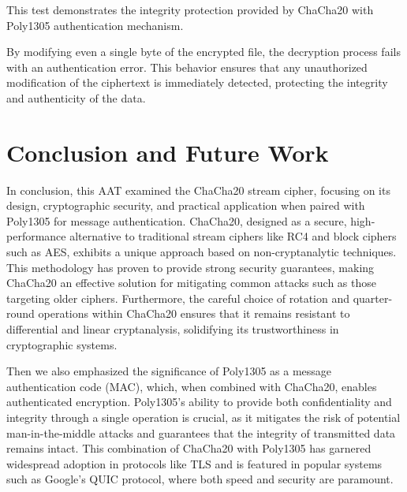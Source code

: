\documentclass[a4paper,12pt]{report}
\begin{document}
This test demonstrates the integrity protection provided by ChaCha20 with Poly1305 authentication mechanism.

By modifying even a single byte of the encrypted file, the decryption process fails with an authentication error.
This behavior ensures that any unauthorized modification of the ciphertext is immediately detected, protecting the integrity and authenticity of the data.





\chapter{Conclusion and Future Work}

In conclusion, this AAT examined the ChaCha20 stream cipher, focusing on its design, cryptographic security, and practical application when paired with Poly1305 for message authentication.
ChaCha20, designed as a secure, high-performance alternative to traditional stream ciphers like RC4 and block ciphers such as AES, exhibits a unique approach based on non-cryptanalytic techniques.
This methodology has proven to provide strong security guarantees, making ChaCha20 an effective solution for mitigating common attacks such as those targeting older ciphers.
Furthermore, the careful choice of rotation and quarter-round operations within ChaCha20 ensures that it remains resistant to differential and linear cryptanalysis, solidifying its trustworthiness in cryptographic systems.

Then we also emphasized the significance of Poly1305 as a message authentication code (MAC), which, when combined with ChaCha20, enables authenticated encryption.
Poly1305's ability to provide both confidentiality and integrity through a single operation is crucial, as it mitigates the risk of potential man-in-the-middle attacks and guarantees that the integrity of transmitted data remains intact.
This combination of ChaCha20 with Poly1305 has garnered widespread adoption in protocols like TLS and is featured in popular systems such as Google's QUIC protocol, where both speed and security are paramount.
\end{document}
